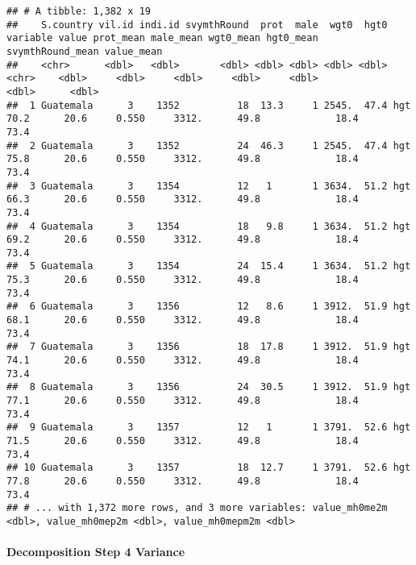 \documentclass[
]{book}
\begin{document}
\begin{verbatim}
## # A tibble: 1,382 x 19
##    S.country vil.id indi.id svymthRound  prot  male  wgt0  hgt0 variable value prot_mean male_mean wgt0_mean hgt0_mean svymthRound_mean value_mean
##    <chr>      <dbl>   <dbl>       <dbl> <dbl> <dbl> <dbl> <dbl> <chr>    <dbl>     <dbl>     <dbl>     <dbl>     <dbl>            <dbl>      <dbl>
##  1 Guatemala      3    1352          18  13.3     1 2545.  47.4 hgt       70.2      20.6     0.550     3312.      49.8             18.4       73.4
##  2 Guatemala      3    1352          24  46.3     1 2545.  47.4 hgt       75.8      20.6     0.550     3312.      49.8             18.4       73.4
##  3 Guatemala      3    1354          12   1       1 3634.  51.2 hgt       66.3      20.6     0.550     3312.      49.8             18.4       73.4
##  4 Guatemala      3    1354          18   9.8     1 3634.  51.2 hgt       69.2      20.6     0.550     3312.      49.8             18.4       73.4
##  5 Guatemala      3    1354          24  15.4     1 3634.  51.2 hgt       75.3      20.6     0.550     3312.      49.8             18.4       73.4
##  6 Guatemala      3    1356          12   8.6     1 3912.  51.9 hgt       68.1      20.6     0.550     3312.      49.8             18.4       73.4
##  7 Guatemala      3    1356          18  17.8     1 3912.  51.9 hgt       74.1      20.6     0.550     3312.      49.8             18.4       73.4
##  8 Guatemala      3    1356          24  30.5     1 3912.  51.9 hgt       77.1      20.6     0.550     3312.      49.8             18.4       73.4
##  9 Guatemala      3    1357          12   1       1 3791.  52.6 hgt       71.5      20.6     0.550     3312.      49.8             18.4       73.4
## 10 Guatemala      3    1357          18  12.7     1 3791.  52.6 hgt       77.8      20.6     0.550     3312.      49.8             18.4       73.4
## # ... with 1,372 more rows, and 3 more variables: value_mh0me2m <dbl>, value_mh0mep2m <dbl>, value_mh0mepm2m <dbl>
\end{verbatim}

\hypertarget{decomposition-step-4-variance}{%
\paragraph{Decomposition Step 4 Variance}\label{decomposition-step-4-variance}}
\end{document}
